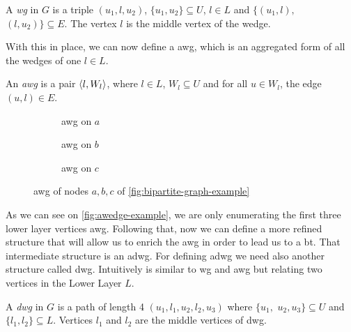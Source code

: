 \begin{definition}[\acrfull{wg}]\label{def:wg}
A \textit{\acrfull{wg}} in $G$ is a triple $(u_1,l,u_2)$, $\{u_1,u_2\}\subseteq U$, $l \in L$ and $\{(u_1,l),$ $(l,u_2)\} \subseteq E$. The vertex $l$ is the middle vertex of the wedge. 
\end{definition}
With this  in place, we can now define a \acrshort{awg}, which is an aggregated form of all the wedges of one $l \in L$.
      
\begin{definition}\label{def:awg}
An \textit{\acrfull{awg}} is a pair $\left\langle l, W_l \right\rangle$, where $l \in L$, $W_l \subseteq U$ and for all $u\in W_l$, the edge  $(u,l)\in E$. 
\end{definition}

\begin{figure}[htp!]
\begin{subfigure}[b]{0.3\textwidth}
\centering
{}
\caption{\acrshort{awg} on $a$}
\label{fig:awedge-example-a}
\end{subfigure}
\begin{subfigure}[b]{0.3\textwidth}
\centering
{}
\caption{\acrshort{awg} on $b$}
\label{fig:awedge-example-b}
\end{subfigure}
\begin{subfigure}[b]{0.3\textwidth}
\centering
{}
\caption{\acrshort{awg} on $c$}
\label{fig:awedge-example-c}
\end{subfigure}
\caption[{[\acrshort{iebt}] Definitions Examples \acrlong{awg}}]{\acrlong{awg} of nodes $a,b,c$ of \autoref{fig:bipartite-graph-example}}
\label{fig:awedge-example}
\end{figure}

As we can see on \autoref{fig:awedge-example}, we are only enumerating the first three lower layer vertices \acrshort{awg}.
Following that, now we can define a more refined structure that will allow us to enrich the \acrshort{awg} in order to lead us to a \acrshort{bt}. 
That intermediate structure is an \acrlong{adwg}. For defining \acrshort{adwg} we need also another structure called \acrlong{dwg}. Intuitively is similar to \acrshort{wg} and \acrshort{awg} but relating two vertices in the Lower Layer $L$.

\begin{definition}
A \textit{\acrfull{dwg}} in $G$ is a path of length 4 $(u_1,l_1,u_2,l_2,u_3)$ where  $\{u_1,$ $u_2,u_3\}\subseteq U$ and $\{l_1,l_2\}\subseteq L$. Vertices $l_1$ and $l_2$ are the middle vertices of \acrshort{dwg}. 
\end{definition}
      
